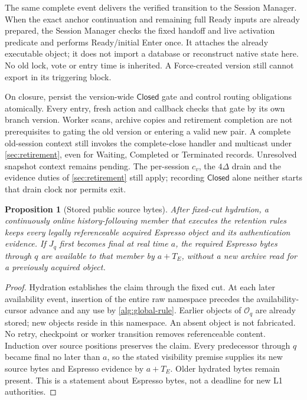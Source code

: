 \documentclass[11pt,a4paper]{article}
\newcommand{\tagg}[1]{\ensuremath{\mathsf{#1}}}
\newtheorem{proposition}[proposition]{Proposition}
\begin{document}
The same complete event delivers the verified transition to the Session
Manager. When the exact anchor continuation and remaining full Ready
inputs are already prepared, the Session Manager checks the fixed handoff and
live activation predicate and performs Ready/initial Enter once. It
attaches the already executable object; it does not import a database
or reconstruct native state here. No old lock, vote or entry time is
inherited. A Force-created version still cannot export in its triggering
block.

On closure, persist the version-wide \tagg{Closed} gate and control
routing obligations atomically. Every entry, fresh action and callback
checks that gate by its own branch version. Worker scans, archive copies and
retirement completion are not prerequisites to gating the old version
or entering a valid new pair. A complete old-session context still
invokes the complete-close handler and multicast under
\cref{sec:retirement}, even for Waiting, Completed or Terminated records.
Unresolved snapshot context remains pending. The per-session
$c_v$, the $4\Delta$ drain and the evidence duties of \cref{sec:retirement} still apply; recording
\tagg{Closed} alone neither starts that drain clock nor permits exit.

\begin{proposition}[Stored public source bytes]
\label{prop:retained-public-bytes}
After fixed-cut hydration, a continuously online history-following
member that executes the retention rules keeps every legally
referenceable acquired Espresso object and its authentication evidence.
If $J_q$ first becomes final at real time $a$, the required Espresso
bytes through $q$ are available to that member by $a+T_E$, without a
new archive read for a previously acquired object.
\end{proposition}
\begin{proof}
Hydration establishes the claim through the fixed cut. At each later
availability event, insertion of the entire raw namespace precedes the
availability-cursor advance and any use by \cref{alg:global-rule}.
Earlier objects of $\mathcal O_q$ are already stored; new objects reside
in this namespace. An absent
object is not fabricated. No retry, checkpoint or worker transition
removes referenceable content. Induction over source positions preserves
the claim. Every predecessor through $q$ became final no later than $a$,
so the stated visibility premise supplies its new source bytes and
Espresso evidence by $a+T_E$. Older hydrated bytes remain present.
This is a statement about Espresso bytes, not a deadline for new L1 authorities.
\end{proof}
\end{document}
